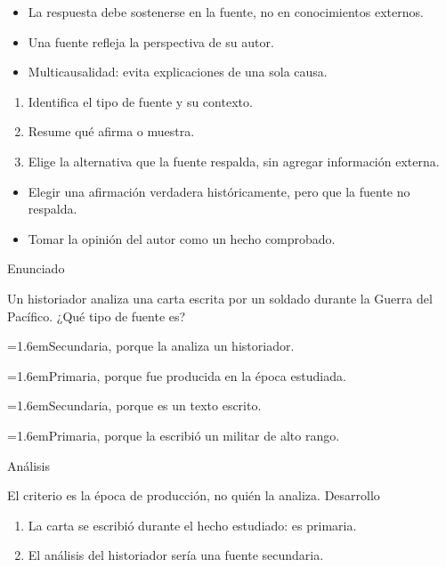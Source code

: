 \documentclass[10pt,a4paper,twocolumn]{article}
\newcommand{\alternativa}[2]{\par\noindent\hangindent=1.6em\hangafter=1\makebox[1.6em][l]{\tecla{#1}}#2\par}
\newcommand{\clave}[1]{\par\smallskip{\sffamily\footnotesize\color{esmeralda} Clave \teclaok{#1}}\par}
\begin{document}
\begin{ideasclave}
\begin{itemize}
  \item La respuesta debe sostenerse en la fuente, no en conocimientos externos.
  \item Una fuente refleja la perspectiva de su autor.
  \item Multicausalidad: evita explicaciones de una sola causa.
\end{itemize}
\end{ideasclave}

\begin{metodo}
\begin{enumerate}
  \item Identifica el tipo de fuente y su contexto.
  \item Resume qué afirma o muestra.
  \item Elige la alternativa que la fuente respalda, sin agregar información externa.
\end{enumerate}
\end{metodo}

\begin{errorfrecuente}
\begin{itemize}
  \item Elegir una afirmación verdadera históricamente, pero que la fuente no respalda.
  \item Tomar la opinión del autor como un hecho comprobado.
\end{itemize}
\end{errorfrecuente}

\begin{ejemplo}
{\sffamily\footnotesize\color{zinc500} Enunciado}\par
Un historiador analiza una carta escrita por un soldado durante la Guerra del Pacífico. ¿Qué tipo de fuente es?
\alternativa{A}{Secundaria, porque la analiza un historiador.}
\alternativa{B}{Primaria, porque fue producida en la época estudiada.}
\alternativa{C}{Secundaria, porque es un texto escrito.}
\alternativa{D}{Primaria, porque la escribió un militar de alto rango.}
\clave{B}
{\sffamily\footnotesize\color{zinc500} Análisis}\par El criterio es la época de producción, no quién la analiza.
{\sffamily\footnotesize\color{zinc500} Desarrollo}
\begin{enumerate}
  \item La carta se escribió durante el hecho estudiado: es primaria.
  \item El análisis del historiador sería una fuente secundaria.
\end{enumerate}
\end{ejemplo}
\end{document}
